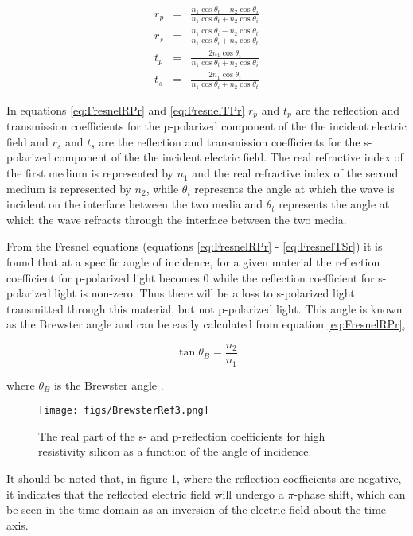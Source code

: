 \begin{eqnarray}
r_{p} &=& \frac{n_{1}\cos{\theta_{t}} - n_{2}\cos{\theta_{i}}}{n_{1}\cos{\theta_{t}} + n_{2}\cos{\theta_{i}}}\label{eq:FresnelRPr}\\
r_{s} &=& \frac{n_{1}\cos{\theta_{i}} - n_{2}\cos{\theta_{t}}}{n_{1}\cos{\theta_{i}} + n_{2}\cos{\theta_{t}}}\label{eq:FresnelRSr}\\
t_{p} &=& \frac{2n_{1}\cos{\theta_{i}}}{n_{1}\cos{\theta_{t}} + n_{2}\cos{\theta_{i}}}\label{eq:FresnelTPr}\\
t_{s} &=& \frac{2n_{1}\cos{\theta_{i}}}{n_{1}\cos{\theta_{i}} + n_{2}\cos{\theta_{t}}}\label{eq:FresnelTSr}
\end{eqnarray}

In equations \ref{eq:FresnelRPr} and \ref{eq:FresnelTPr} $r_{p}$ and $t_{p}$ are the reflection and transmission coefficients for the p-polarized component of the the incident electric field and $r_{s}$ and $t_{s}$ are the reflection and transmission coefficients for the s-polarized component of the the incident electric field. The real refractive index of the first medium is represented by $n_{1}$ and the real refractive index of the second medium is represented by $n_{2}$, while $\theta_{i}$ represents the angle at which the wave is incident on the interface between the two media and $\theta_{t}$ represents the angle at which the wave refracts through the interface between the two media.

From the Fresnel equations (equations \ref{eq:FresnelRPr} - \ref{eq:FresnelTSr}) it is found that at a specific angle of incidence, for a given material
the reflection coefficient for p-polarized light becomes $0$ while the reflection coefficient for s-polarized light is non-zero. Thus there will be a loss to s-polarized light transmitted through this material, but not p-polarized light. This angle is known as the Brewster angle and can be easily calculated from equation \ref{eq:FresnelRPr},

\begin{equation}
\tan{\theta_{B}} = \frac{n_{2}}{n_{1}}
\label{eq:Brewster}
\end{equation}

where $\theta_{B}$ is the Brewster angle \cite{Griffiths-2008}.

\begin{figure}[H]
\begin{center}
	 \texttt{[image: figs/BrewsterRef3.png]}
	 \caption[Reflection coefficients of high resistivity silicon.]{The real part of the s- and p-reflection coefficients for high resistivity silicon as a function of the angle of incidence.}
   \label{fig:BrewRef}
\end{center}
\end{figure}
It should be noted that, in figure \ref{fig:BrewRef}, where the reflection coefficients are negative, it indicates that the reflected electric field will undergo a $\pi$-phase shift, which can be seen in the time domain as an inversion of the electric field about the time-axis.

